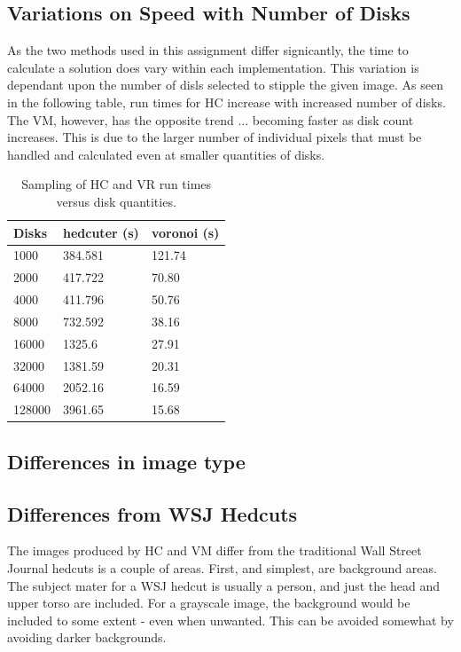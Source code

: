 \documentclass[11pt]{article}
\begin{document}
\subsection{Variations on Speed with Number of Disks}
As the two methods used in this assignment differ signicantly, the time to calculate a solution does vary within each implementation. This variation is dependant upon the number of disls selected to stipple the given image. As seen in the following table, run times for HC increase with increased number of disks. The VM, however, has the opposite trend ... becoming faster as disk count increases. This is due to the larger number of individual pixels that must be handled and calculated even at smaller quantities of disks.

\begin{table}
\centering
\caption{Sampling of HC and VR run times versus disk quantities.}
\label{table1}
	\begin{tabular}{ | l | l | p{1.8cm} |}
	\hline
	Disks & hedcuter (s) & voronoi (s) \\ \hline
	1000 & 384.581 & 121.74 \\ \hline
	2000 & 417.722 & 70.80 \\ \hline
	4000 & 411.796 & 50.76 \\ \hline
	8000 & 732.592 & 38.16 \\ \hline
	16000 & 1325.6 & 27.91 \\ \hline
	32000 & 1381.59 & 20.31 \\ \hline
	64000 & 2052.16 & 16.59 \\ \hline
	128000 & 3961.65 & 15.68 \\ \hline
	\end{tabular}
\end{table}

\subsection{Differences in image type}

\subsection{Differences from WSJ Hedcuts}
The images produced by HC and VM differ from the traditional Wall Street Journal hedcuts is a couple of areas. First, and simplest, are background areas. The subject mater for a WSJ hedcut is usually a person, and just the head and upper torso are included. For a grayscale image, the background would be included to some extent - even when unwanted. This can be avoided somewhat by avoiding darker backgrounds.
\end{document}
